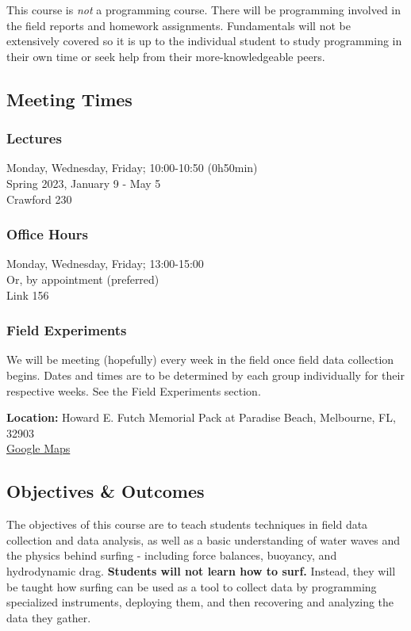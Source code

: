 \documentclass[
	letterpaper, %
	fontsize=10pt, %
	twoside=true, %
	numbers=noenddot, %
]{kaobook}
\begin{document}
This course is \emph{not} a programming course.
There will be programming involved in the field reports and homework assignments.
Fundamentals will not be extensively covered so it is up to the individual student to study programming in their own time or seek help from their more-knowledgeable peers.

\subsection*{Meeting Times} \label{meeting_times}
\subsubsection*{Lectures}
Monday, Wednesday, Friday; 10:00-10:50 (0h50min)\\
Spring 2023, January 9 - May 5\\
Crawford 230

\subsubsection*{Office Hours}
Monday, Wednesday, Friday; 13:00-15:00\\
Or, by appointment (preferred)\\
Link 156

\subsubsection*{Field Experiments}
We will be meeting (hopefully) every week in the field once field data collection begins. 
Dates and times are to be determined by each group individually for their respective weeks. See the Field Experiments section.

\textbf{Location:} Howard E. Futch Memorial Pack at Paradise Beach, Melbourne, FL, 32903 \\
\href{https://goo.gl/maps/tjdfqDwxHv3FmtNz8}{Google Maps}

\subsection*{Objectives \& Outcomes} \label{ssec:objectives_outcomes}
The objectives of this course are to teach students techniques in field data collection and data analysis, as well as a basic understanding of water waves and the physics behind surfing - including force balances, buoyancy, and hydrodynamic drag.
\textbf{Students will not learn how to surf.}
Instead, they will be taught how surfing can be used as a tool to collect data by programming specialized instruments, deploying them, and then recovering and analyzing the data they gather.
\end{document}
